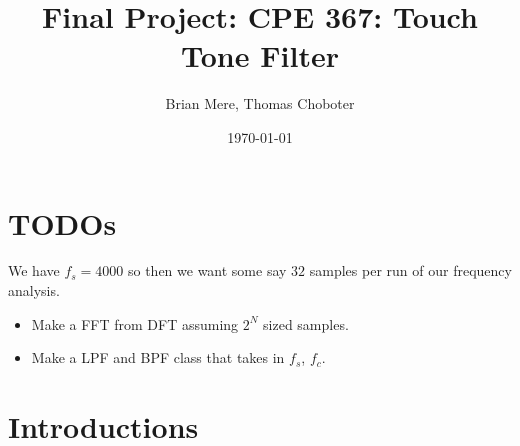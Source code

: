 \documentclass[12pt]{article}
\title{Final Project: CPE 367: Touch Tone Filter}
\author{Brian Mere, Thomas Choboter}
\date{\today}
\begin{document}
 

\inserttitlepage 

\section*{TODOs}

We have $f_s = 4000$ so then we want some say $32$ samples per 
run of our frequency analysis. 

\begin{itemize}
    \item Make a FFT from DFT assuming $2^N$ sized samples. 
    \item Make a LPF and BPF class that takes in $f_s$, $f_c$.
\end{itemize}

\section*{Introductions}
\end{document}
